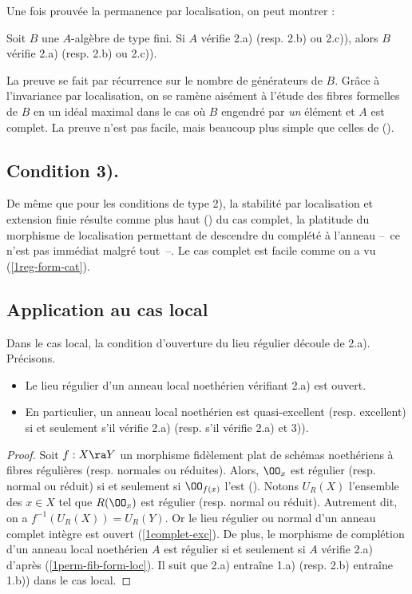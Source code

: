 \documentclass[10pt]{../fichiers-configuration-latex/smfart}
\begin{document}
Une fois prouvée la permanence par localisation, on peut montrer :

\begin{theoreme2} Soit $B$ une $A$-algèbre de type fini. Si $A$ vérifie 2.a) (resp. 2.b) ou 2.c)),
alors $B$ vérifie 2.a) (resp. 2.b) ou 2.c)).\end{theoreme2}

La  preuve se fait par récurrence sur le nombre de générateurs de $B$. Grâce à l'invariance par
localisation, on se ramène aisément à l'étude des fibres formelles de $B$ en un idéal maximal dans
le cas où  $B$ engendré par \emph{un} élément et $A$ est complet. La preuve n'est pas facile, mais
beaucoup plus simple que celles de ().

\subsection{Condition 3).} De même que pour les conditions de type 2), la stabilité par localisation
et extension finie résulte comme plus haut () du cas complet, la platitude du
morphisme de localisation permettant de descendre du complété à l'anneau -- ce n'est pas immédiat
malgré tout --. Le cas complet est facile comme on a vu (\ref{1reg-form-cat}).

\subsection{Application au cas local} Dans le cas local, la condition d'ouverture du lieu régulier
découle de 2.a). Précisons.

\begin{proposition2}\label{1loc-exc} \begin{itemize} \item [i)] Le lieu régulier d'un anneau local
noethérien vérifiant 2.a) est ouvert.  \item [ii)] En particulier, un anneau local noethérien est
quasi-excellent (resp.  excellent) si et seulement s'il vérifie 2.a) (resp.  s'il vérifie 2.a) et
3)).  \end{itemize} \end{proposition2}

\begin{proof}

Soit $f:X\ra Y$ un morphisme fidèlement plat de schémas noethériens à fibres régulières (resp.
normales ou réduites). Alors, $\OO_x$ est  régulier (resp.  normal ou réduit) si et seulement si
$\OO_{f(x)}$ l'est ().  Notons $U_R(X)$ l'ensemble des $x\in X$ tel que
$R(\OO_x)$ est régulier (resp.  normal ou réduit). Autrement dit, on a $f^{-1}(U_R(X))=U_R(Y)$. Or
le lieu régulier ou normal d'un anneau complet intègre est ouvert  (\ref{1complet-exc}). De plus, le
morphisme de complétion d'un anneau local noethérien $A$ est régulier si et seulement si $A$ vérifie
2.a) d'après (\ref{1perm-fib-form-loc}). Il suit que 2.a) entraîne 1.a) (resp.  2.b) entraîne 1.b))
dans le cas local.  \end{proof}
\end{document}
